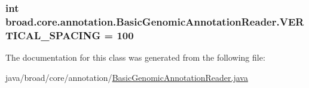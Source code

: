 \hypertarget{classbroad_1_1core_1_1annotation_1_1_basic_genomic_annotation_reader_a24b39789f7632a795032438895c93973}{
\subsubsection[{V\+E\+R\+T\+I\+C\+A\+L\+\_\+\+S\+P\+A\+C\+I\+N\+G}]{\setlength{\rightskip}{0pt plus 5cm}int broad.\+core.\+annotation.\+Basic\+Genomic\+Annotation\+Reader.\+V\+E\+R\+T\+I\+C\+A\+L\+\_\+\+S\+P\+A\+C\+I\+N\+G = 100\hspace{0.3cm}{\ttfamily [static]}}}\label{classbroad_1_1core_1_1annotation_1_1_basic_genomic_annotation_reader_a24b39789f7632a795032438895c93973}


The documentation for this class was generated from the following file\+:\begin{DoxyCompactItemize}
\item 
java/broad/core/annotation/\hyperlink{_basic_genomic_annotation_reader_8java}{Basic\+Genomic\+Annotation\+Reader.\+java}\end{DoxyCompactItemize}
